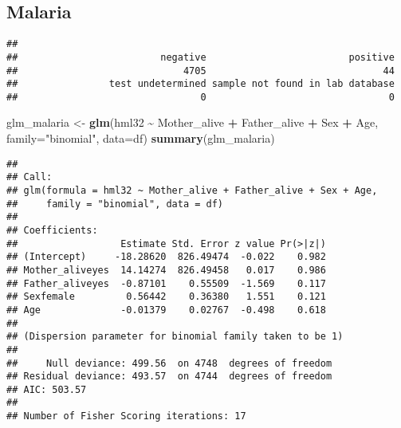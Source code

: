 \documentclass[
]{article}
\newenvironment{Shaded}{\begin{snugshade}}{\end{snugshade}}
\newcommand{\AttributeTok}[1]{\textcolor[rgb]{0.13,0.29,0.53}{#1}}
\newcommand{\FunctionTok}[1]{\textcolor[rgb]{0.13,0.29,0.53}{\textbf{#1}}}
\newcommand{\NormalTok}[1]{#1}
\newcommand{\OtherTok}[1]{\textcolor[rgb]{0.56,0.35,0.01}{#1}}
\newcommand{\SpecialCharTok}[1]{\textcolor[rgb]{0.81,0.36,0.00}{\textbf{#1}}}
\newcommand{\StringTok}[1]{\textcolor[rgb]{0.31,0.60,0.02}{#1}}
\begin{document}
\hypertarget{malaria}{%
\subsection{Malaria}\label{malaria}}

\begin{Shaded}
\end{Shaded}

\begin{verbatim}
## 
##                         negative                         positive 
##                             4705                               44 
##                test undetermined sample not found in lab database 
##                                0                                0
\end{verbatim}

\begin{Shaded}
\begin{Highlighting}[]
\NormalTok{glm\_malaria }\OtherTok{\textless{}{-}} \FunctionTok{glm}\NormalTok{(hml32 }\SpecialCharTok{\textasciitilde{}}\NormalTok{ Mother\_alive }\SpecialCharTok{+}\NormalTok{ Father\_alive }\SpecialCharTok{+}\NormalTok{ Sex }\SpecialCharTok{+}\NormalTok{ Age,}
                  \AttributeTok{family=}\StringTok{"binomial"}\NormalTok{, }\AttributeTok{data=}\NormalTok{df)}
\FunctionTok{summary}\NormalTok{(glm\_malaria)}
\end{Highlighting}
\end{Shaded}

\begin{verbatim}
## 
## Call:
## glm(formula = hml32 ~ Mother_alive + Father_alive + Sex + Age, 
##     family = "binomial", data = df)
## 
## Coefficients:
##                  Estimate Std. Error z value Pr(>|z|)
## (Intercept)     -18.28620  826.49474  -0.022    0.982
## Mother_aliveyes  14.14274  826.49458   0.017    0.986
## Father_aliveyes  -0.87101    0.55509  -1.569    0.117
## Sexfemale         0.56442    0.36380   1.551    0.121
## Age              -0.01379    0.02767  -0.498    0.618
## 
## (Dispersion parameter for binomial family taken to be 1)
## 
##     Null deviance: 499.56  on 4748  degrees of freedom
## Residual deviance: 493.57  on 4744  degrees of freedom
## AIC: 503.57
## 
## Number of Fisher Scoring iterations: 17
\end{verbatim}
\end{document}
